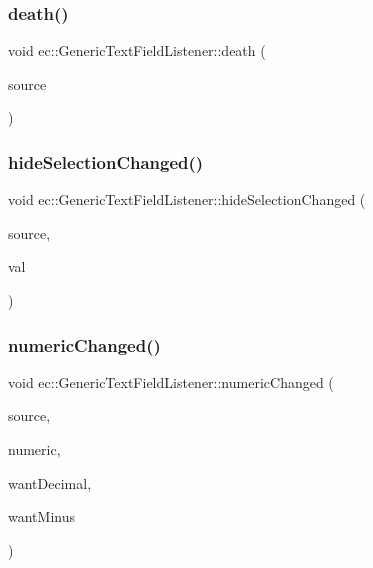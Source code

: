 \subsubsection{\texorpdfstring{death()}{death()}}
{\footnotesize\ttfamily void ec\+::\+Generic\+Text\+Field\+Listener\+::death (\begin{DoxyParamCaption}\item[{agui\+::\+Text\+Field $\ast$}]{source }\end{DoxyParamCaption})\hspace{0.3cm}{\ttfamily [override]}}

\mbox{\label{classec_1_1_generic_text_field_listener_a53ee00fec8f9d4a56394521c2773cb5d}} 
\subsubsection{\texorpdfstring{hide\+Selection\+Changed()}{hideSelectionChanged()}}
{\footnotesize\ttfamily void ec\+::\+Generic\+Text\+Field\+Listener\+::hide\+Selection\+Changed (\begin{DoxyParamCaption}\item[{agui\+::\+Text\+Field $\ast$}]{source,  }\item[{bool}]{val }\end{DoxyParamCaption})\hspace{0.3cm}{\ttfamily [override]}}

\mbox{\label{classec_1_1_generic_text_field_listener_ab65f5b7d2527c5785c1ec5db708f19a2}} 
\subsubsection{\texorpdfstring{numeric\+Changed()}{numericChanged()}}
{\footnotesize\ttfamily void ec\+::\+Generic\+Text\+Field\+Listener\+::numeric\+Changed (\begin{DoxyParamCaption}\item[{agui\+::\+Text\+Field $\ast$}]{source,  }\item[{bool}]{numeric,  }\item[{bool}]{want\+Decimal,  }\item[{bool}]{want\+Minus }\end{DoxyParamCaption})\hspace{0.3cm}{\ttfamily [override]}}

